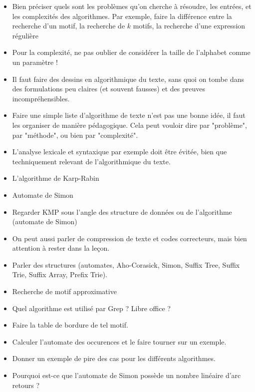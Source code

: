 \documentclass{agregfiche}
\begin{document}
\begin{itemize}
    \item Bien préciser quels sont les problèmes qu'on cherche 
        à résoudre, les entrées, et les complexités des algorithmes.
        Par exemple, faire la différence entre la recherche 
        d'un motif, la recherche de $k$ motifs, la recherche 
        d'une expression régulière 

    \item Pour la complexité, ne pas oublier de 
        considérer la taille de l'alphabet comme un paramètre !

    \item Il faut faire des dessins en algorithmique du texte, sans 
        quoi on tombe dans des formulations peu claires (et souvent 
        fausses) et des preuves incompréhensibles.

    \item Faire une simple liste d'algorithme de texte n'est pas 
        une bonne idée, il faut les organiser de manière pédagogique.
        Cela peut vouloir dire par "problème", par "méthode", ou 
        bien par "complexité".

    \item L'analyse lexicale et syntaxique par exemple doit être évitée, bien que techniquement
        relevant de l'algorithmique du texte.

\end{itemize}

\secidees

\begin{itemize}
    \item L'algorithme de Karp-Rabin
    \item Automate de Simon
    \item Regarder KMP sous l'angle des structure de données 
        ou de l'algorithme (automate de Simon)
    \item 
        On peut aussi parler de compression de texte et codes 
        correcteurs, mais bien attention à rester dans la leçon.
    \item 
        Parler des structures (automates, Aho-Corasick, Simon,
        Suffix Tree, Suffix Trie, Suffix Array, Prefix Trie).

    \item Recherche de motif approximative
\end{itemize}

\secquestionsclassiques

\begin{itemize}
    \item Quel algorithme est utilisé par Grep ? Libre office ?
    \item Faire la table de bordure de tel motif.
    \item Calculer l'automate des occurences et le faire tourner sur un exemple.
    \item Donner un exemple de pire des cas pour les différents algorithmes.
    \item Pourquoi est-ce que l'automate de Simon possède un nombre linéaire
        d'arc retours ?
\end{itemize}
\end{document}
